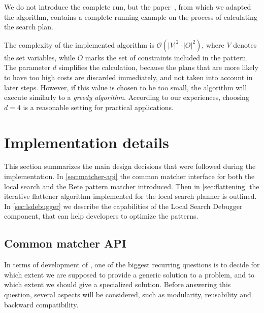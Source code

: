 We do not introduce the complete run, but the paper~\cite{DBLP:journals/sosym/VarroDWS15}, from which we adapted the algorithm, contains a complete running example on the process of calculating the search plan.

The complexity of the implemented algorithm is $\mathcal{O}(|V|^2 \cdot |O|^2)$, where $V$ denotes the set variables, while $O$ marks the set of constraints included in the pattern. The parameter $d$ simplifies the calculation, because the plans that are more likely to have too high costs are discarded immediately, and not taken into account in later steps. However, if this value is chosen to be too small, the algorithm will execute similarly to a \emph{greedy algorithm}. According to our experiences, choosing $d=4$ is a reasonable setting for practical applications.





\section{Implementation details}
\label{sec:implementation}

This section summarizes the main design decisions that were followed during the implementation.
In \autoref{sec:matcher-api} the common matcher interface for both the local search and the Rete pattern matcher introduced. Then in \autoref{sec:flattening} the iterative flattener algorithm implemented for the local search planner is outlined. In \autoref{sec:lsdebugger} we describe the capabilities of the Local Search Debugger component, that can help developers to optimize the patterns.


\subsection{Common matcher API}
\label{sec:matcher-api}
In terms of development of \eiq, one of the biggest recurring questions is to decide for which extent we are supposed to provide a generic solution to a problem, and to which extent we should give a specialized solution. Before answering this question, several aspects will be considered, such as modularity, reusability and backward compatibility. 



